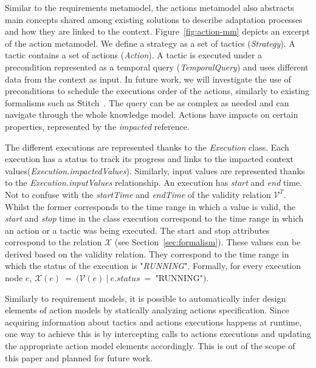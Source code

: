 Similar to the requirements metamodel, the actions metamodel also abstracts main concepts shared among existing solutions to describe adaptation processes and how they are linked to the context. Figure~\ref{fig:action-mm} depicts an excerpt of the action metamodel.
We define a strategy as a set of tactics (\textit{Strategy}).
A tactic contains a set of actions (\textit{Action}).
A tactic is executed under a precondition represented as a temporal query (\textit{TemporalQuery}) and uses different data from the context as input. In future work, we will investigate the use of preconditions to schedule the executions order of the actions, similarly to existing formalisms such as Stitch~\cite{DBLP:journals/jss/ChengG12}.
The query can be as complex as needed and can navigate through the whole knowledge model.
Actions have impacts on certain properties, represented by the \textit{impacted} reference. 

The different executions are represented thanks to the \textit{Execution} class. Each execution has a status to track its progress and links to the impacted context values(\textit{Execution.impactedValues}).
Similarly, input values are represented thanks to the \textit{Execution.inputValues} relationship.
An execution has \textit{start} and \textit{end} time. Not to confuse with the \textit{startTime} and \textit{endTime} of the validity relation $\mathcal{V}^T$. Whilst the former corresponds to the time range in which a value is valid, the \textit{start} and \textit{stop} time in the class execution correspond to the time range in which an action or a tactic was being executed. The start and stop attributes correspond to the relation $\mathcal{X}$ (see Section~\ref{sec:formalism}). These values can be derived based on the validity relation. They correspond to the time range in which the status of the execution is "\textit{RUNNING}".  Formally, for every execution node $e$, $\mathcal{X}(e)~=~(\mathcal{V}(e)~|~e.status~=~$"RUNNING"$)$.


Similarly to requirement models, it is possible to automatically infer design elements of action models by statically analyzing actions specification.
Since acquiring information about tactics and actions executions happens at runtime, one way to achieve this is by intercepting calls to actions executions and updating the appropriate action model elements accordingly. This is out of the scope of this paper and planned for future work.
 
 






